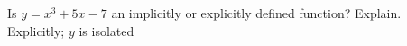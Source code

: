 {Is $y=x^3+5x-7$ an implicitly or explicitly defined function? Explain.}
{Explicitly; $y$ is isolated}

